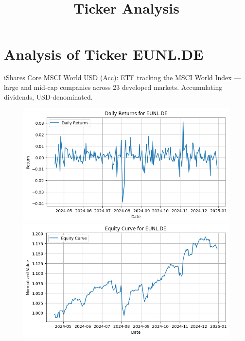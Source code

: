 \documentclass{article}%
\title{Ticker Analysis}%
\author{}%
\date{}%
\begin{document}
%
\normalsize%
\maketitle%
\section*{Analysis of Ticker EUNL.DE}%
\label{sec:AnalysisofTickerEUNL.DE}%
iShares Core MSCI World USD (Acc): ETF tracking the MSCI World Index — large and mid‑cap companies across 23 developed markets. Accumulating dividends, USD‑denominated.%


\begin{figure}[htbp]%
\begin{minipage}{0.49\textwidth}%
\includegraphics[width=\linewidth]{ticker_images/EUNL.DE_daily_returns.png}%
\end{minipage}%
\begin{minipage}{0.49\textwidth}%
\includegraphics[width=\linewidth]{ticker_images/EUNL.DE_equity_curve.png}%
\end{minipage}%
\end{figure}
\end{document}
